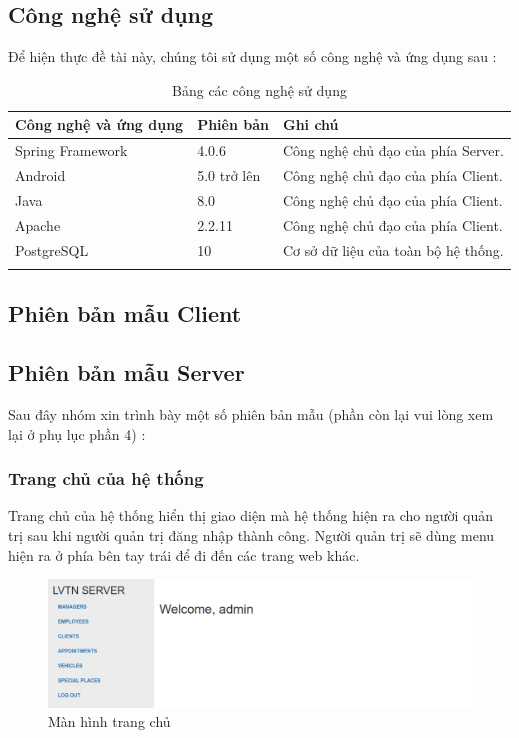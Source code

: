 \documentclass{article}
\begin{document}
\subsection{Công nghệ sử dụng}
Để hiện thực đề tài này, chúng tôi sử dụng một số công nghệ và ứng dụng sau : 
\begin{longtable}{ | p{} |p{} | p{}  | } 
\hline
\textbf{Công nghệ và ứng dụng}& \textbf{Phiên bản}& \textbf{Ghi chú} \\ 
\hline
\hline
Spring Framework &
4.0.6 &
Công nghệ chủ đạo của phía Server.
\\ 
\hline
Android  &
5.0 trở lên &
Công nghệ chủ đạo của phía Client.
\\ 
\hline
Java  &
8.0 &
Công nghệ chủ đạo của phía Client.
\\ 
\hline
Apache  &
2.2.11 &
Công nghệ chủ đạo của phía Client.
\\ 
\hline
PostgreSQL  &
10 &
Cơ sở dữ liệu của toàn bộ hệ thống.
\\ 

\hline

\caption{Bảng các công nghệ sử dụng}
\end{longtable}

\subsection{Phiên bản mẫu Client}

\subsection{Phiên bản mẫu Server}
Sau đây nhóm xin trình bày một số phiên bản mẫu (phần còn lại vui lòng xem lại ở phụ lục phần 4) :
\subsubsection{Trang chủ của hệ thống}
Trang chủ của hệ thống hiển thị giao diện mà hệ thống hiện ra cho người quản trị sau khi người quản trị đăng nhập thành công. Người quản trị sẽ dùng menu hiện ra ở phía
bên tay trái để đi đến các trang web khác.

\begin{figure}[H]
\centering
\includegraphics[scale=0.5]{admin_trangchu}
\caption{Màn hình trang chủ}
\end{figure}
\end{document}
